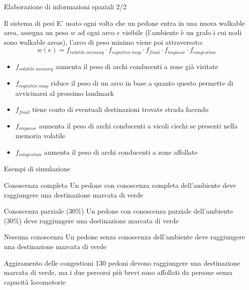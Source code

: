 \documentclass{beamer}
\begin{document}
\begin{frame}{Elaborazione di informazioni spaziali 2/2}
\begin{block}{Il sistema di pesi}
E' usato ogni volta che un pedone entra in una nuova walkable area, assegna un peso \(w\) ad ogni arco \(e\) visibile (l'ambiente è un grafo i cui nodi sono walkable areas), l'arco di peso minimo viene poi attraversato:
\begin{equation}
    w(e) = f_{volatile\ memory}\cdot f_{cognitive\ map}\cdot f_{final}\cdot f_{impasse}\cdot f_{congestion}
\end{equation}{}
\begin{itemize}
    \item \(f_{volatile\ memory}\) aumenta il peso di archi conducenti a zone già visitate
    \item \(f_{cognitive\ map}\) riduce il peso di un arco in base a quanto questo permette di avvicinarsi al prossimo landmark
    \item \(f_{final}\) tiene conto di eventuali destinazioni trovate strada facendo
    \item \textcolor{bostonuniversityred}{\(f_{impasse}\)} aumenta il peso di archi conducenti a vicoli ciechi se presenti nella memoria volatile
    \item \textcolor{bostonuniversityred}{\(f_{congestion}\)} aumenta il peso di archi conducenti a zone affollate
\end{itemize}
\end{block}
\end{frame}

\begin{frame}{Esempi di simulazione}
\begin{block}{Conoscenza completa}
Un pedone con conoscenza completa dell'ambiente deve raggiungere una destinazione marcata di verde
\end{block}
\begin{block}{Conoscenza parziale (30\%)}
Un pedone con conoscenza parziale dell'ambiente (30\%) deve raggiungere una destinazione marcata di verde
\end{block}
\begin{block}{Nessuna conoscenza}
Un pedone senza conoscenza dell'ambiente deve raggiungere una destinazione marcata di verde
\end{block}
\begin{block}{Aggiramento delle congestioni}
130 pedoni devono raggiungere una destinazione marcata di verde, ma i due percorsi più brevi sono affollati da persone senza capacità locomotorie
\end{block}
\end{frame}{}
\end{document}
